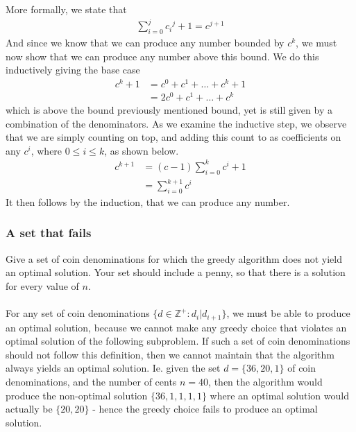 \documentclass[11pt,english]{article}
\begin{document}
More formally, we state that
\begin{align}
	\sum_{i=0}^{j} c{_i}^{j} + 1 = c^{j+1}
\end{align}
And since we know that we can produce any number bounded by $c^k$, we must
now show that we can produce any number above this bound. We do this
inductively giving the base case
\begin{align}
	c^k + 1 &= c^0 + c^1 + \dots + c^k + 1\\
	&= 2c^0 + c^1 + \dots + c^k
\end{align}
which is above the bound previously mentioned bound, yet is still given by a
combination of the denominators. As we examine the inductive step, we observe
that we are simply counting on top, and adding this count to as coefficients
on any $c^i$, where $0 \leq i \leq k$, as shown below.
\begin{align}
	c^{k+1} &= (c - 1)\sum_{i=0}^{k}{c^i} + 1\\
	&= \sum_{i=0}^{k+1}{c^i} \nonumber
\end{align}
It then follows by the induction, that we can produce any number.

\subsubsection*{A set that fails}
\large{Give a set of coin denominations for which the greedy algorithm
does not yield an optimal solution. Your set should include a penny, so
that there is a solution for every value of $n$.}
\\\\
For any set of coin denominations
$\{d \in \mathbb{Z}^{+} : d_i | d_{i+1}\}$, we must be able to produce an
optimal solution, because we cannot make any greedy choice that violates an
optimal solution of the following subproblem. If such a set of coin
denominations should not follow this definition, then we cannot maintain
that the algorithm always yields an optimal solution. Ie. given the set
$d = \{36, 20, 1\}$ of coin denominations, and the number of cents $n = 40$,
then the algorithm would produce the non-optimal solution $\{36, 1, 1, 1, 1\}$
where an optimal solution would actually be $\{20, 20\}$ - hence the greedy
choice fails to produce an optimal solution.
\end{document}
